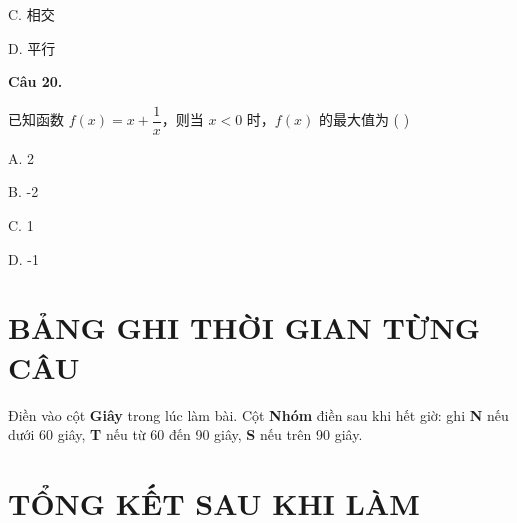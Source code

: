 \documentclass[11pt, a4paper]{article}
\begin{document}
C. 相交

D. 平行

\textbf{Câu 20.}

已知函数 $f(x) = x + \dfrac{1}{x}$，则当 $x < 0$ 时，$f(x)$ 的最大值为 ( )

A. 2

B. -2

C. 1

D. -1

\section{BẢNG GHI THỜI GIAN TỪNG CÂU}

Điền vào cột \textbf{Giây} trong lúc làm bài. Cột \textbf{Nhóm} điền sau khi hết giờ: ghi \textbf{N} nếu dưới 60 giây, \textbf{T} nếu từ 60 đến 90 giây, \textbf{S} nếu trên 90 giây.


\section{TỔNG KẾT SAU KHI LÀM}
\end{document}
